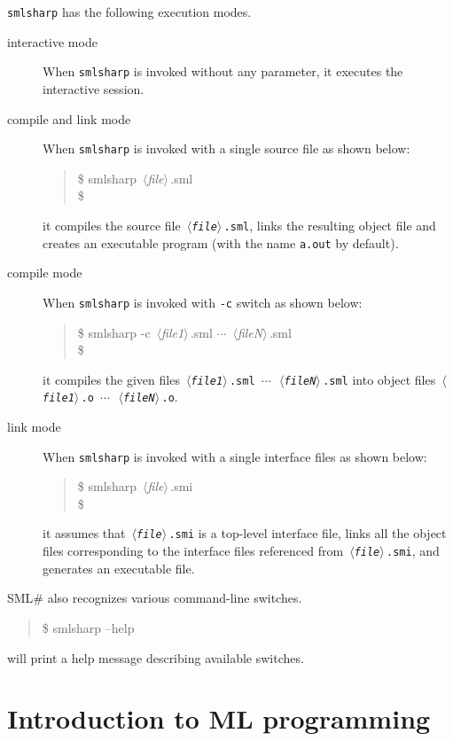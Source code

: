 \documentclass{jbook}
\newcommand{\txt}[2]{#2}
\newcommand{\smlsharp}{SML\#}
\newcommand{\nonterm}[1]{\mbox{$\,\langle$}{\it #1}\mbox{$\rangle\,$}}
\newenvironment{program}{\begin{quote}\begin{tt}}%
                        {\end{tt}\end{quote}}
\begin{document}
\else%
	{\tt smlsharp} has the following execution modes.
\begin{description}
\item[interactive mode]
When {\tt smlsharp} is invoked without any parameter,
it executes the interactive session.
\item[compile and link mode]
When {\tt smlsharp} is invoked with a single source file as shown below:
\begin{program}
\$ smlsharp \nonterm{file}.sml\\
\$ 
\end{program}
it compiles the source file {\tt \nonterm{file}.sml}, links the resulting
object file and creates an executable program (with the name {\tt a.out}
by default).
\item[compile mode]
When {\tt smlsharp} is invoked with {\tt -c} switch as shown below:
\begin{program}
\$ smlsharp -c \nonterm{file1}.sml $\cdots$ \nonterm{fileN}.sml \\
\$ 
\end{program}
it compiles the given files {\tt \nonterm{file1}.sml $\cdots$
\nonterm{fileN}.sml}
into object files {\tt \nonterm{file1}.o $\cdots$
\nonterm{fileN}.o}.
\item[link mode]
When {\tt smlsharp} is invoked with a single interface files as shown below:
\begin{program}
\$ smlsharp \nonterm{file}.smi \\
\$ 
\end{program}
it assumes that {\tt \nonterm{file}.smi} is a top-level interface file,
links all the object files corresponding to the interface files
referenced from {\tt \nonterm{file}.smi}, 
and generates an executable file.
\end{description}
	\smlsharp{} also recognizes various command-line switches.
\begin{program}
\$ smlsharp --help
\end{program}
will print a help message describing available switches.
\fi%

\chapter{\txt{MLプログラミング入門}{Introduction to ML programming}}
\label{chap:tutorialMlprogramming}
\end{document}
